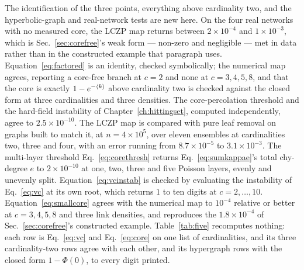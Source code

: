 The identification of the three points, everything above cardinality two, and
the hyperbolic-graph and real-network tests are new here. On the four real
networks with no measured core, the LCZP map returns between
$2\times10^{-4}$ and $1\times10^{-3}$, which is Sec.~\ref{sec:corefree}'s weak
form --- non-zero and negligible --- met in data rather than in the constructed
example that paragraph uses. Equation~\eqref{eq:factored} is an
identity, checked symbolically; the numerical map agrees, reporting a core-free
branch at $c=2$ and none at $c=3,4,5,8$, and that the core is exactly
$1-e^{-\langle k \rangle}$ above cardinality two is checked against the closed form at
three cardinalities and three densities. The core-percolation threshold and the
hard-field instability of Chapter~\ref{ch:hittingset}, computed independently,
agree to $2.5\times10^{-10}$. The LCZP map is compared with pure
leaf removal on graphs built to match it, at $n=4\times10^{5}$, over eleven
ensembles at cardinalities two, three and four, with an error running from
$8.7\times10^{-5}$ to $3.1\times10^{-3}$. The multi-layer threshold
Eq.~\eqref{eq:corethresh} returns Eq.~\eqref{eq:sumkappae}'s total chy-degree
$e$ to $2\times10^{-10}$ at one, two, three and five Poisson layers, evenly and
unevenly split. Equation~\eqref{eq:vcinstab} is checked by evaluating the
instability of Eq.~\eqref{eq:vc} at its own root, which returns $1$ to ten
digits at $c=2,\dots,10$. Equation~\eqref{eq:smallcore} agrees with the
numerical map to $10^{-4}$ relative or better at $c=3,4,5,8$ and three link
densities, and reproduces the $1.8\times10^{-4}$ of
Sec.~\ref{sec:corefree}'s constructed example. Table~\ref{tab:five} recomputes
nothing: each row is Eq.~\eqref{eq:vc} and Eq.~\eqref{eq:core} on one list of
cardinalities, and its three cardinality-two rows agree with each other, and its
hypergraph rows with the closed form $1-\Phi(0)$, to every digit printed.

